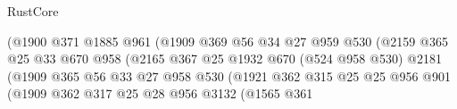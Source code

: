 \begin{lexlean}{RustCore}
\begin{coremodule}
                                          (@1900
                                            @371
                                            @1885
                                            @961
                                            (@1909
                                              @369
                                              @56
                                              @34
                                              @27
                                              @959
                                              @530
                                              (@2159
                                                @365
                                                @25
                                                @33
                                                @670
                                                @958
                                                (@2165
                                                  @367
                                                  @25
                                                  @1932
                                                  @670
                                                  (@524 @958 @530)
                                                  @2181
                                                  (@1909
                                                    @365
                                                    @56
                                                    @33
                                                    @27
                                                    @958
                                                    @530
                                                    (@1921
                                                      @362
                                                      @315
                                                      @25
                                                      @25
                                                      @956
                                                      @901
                                                      (@1909
                                                        @362
                                                        @317
                                                        @25
                                                        @28
                                                        @956
                                                        @3132
                                                        (@1565
                                                          @361

\end{coremodule}
\end{lexlean}
